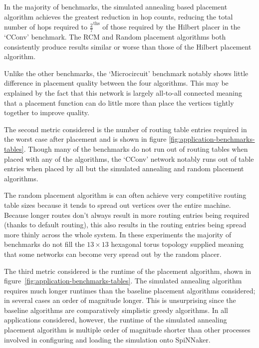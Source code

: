 				In the majority of benchmarks, the simulated annealing based placement
				algorithm achieves the greatest reduction in hop counts, reducing the
				total number of hops required to $\frac{2}{7}^\textrm{ths}$ of those
				required by the Hilbert placer in the `CConv' benchmark. The RCM and
				Random placement algorithms both consistently produce results similar
				or worse than those of the Hilbert placement algorithm.
				
				Unlike the other benchmarks, the `Microcircuit' benchmark notably shows
				little difference in placement quality between the four algorithms.
				This may be explained by the fact that this network is largely
				all-to-all connected meaning that a placement function can do little
				more than place the vertices tightly together to improve quality.
				
				The second metric considered is the number of routing table entries
				required in the worst case after placement and is shown in figure
				\ref{fig:application-benchmarks-tables}. Though many of the benchmarks
				do not run out of routing tables when placed with any of the
				algorithms, the `CConv' network notably runs out of table entries when
				placed by all but the simulated annealing and random placement
				algorithms.
				
				The random placement algorithm is can often achieve very competitive
				routing table sizes because it tends to spread out vertices over the
				entire machine. Because longer routes don't always result in more
				routing entries being required (thanks to default routing), this also
				results in the routing entries being spread more thinly across the
				whole system. In these experiments the majority of benchmarks do not
				fill the $13\times13$ hexagonal torus topology supplied meaning that
				some networks can become very spread out by the random placer.
				
				The third metric considered is the runtime of the placement algorithm,
				shown in figure~\ref{fig:application-benchmarks-tables}. The simulated
				annealing algorithm requires much longer runtimes than the baseline
				placement algorithms considered; in several cases an order of magnitude
				longer. This is unsurprising since the baseline algorithms are
				comparatively simplistic greedy algorithms. In all applications
				considered, however, the runtime of the simulated annealing placement
				algorithm is multiple order of magnitude shorter than other processes
				involved in configuring and loading the simulation onto SpiNNaker.
				
